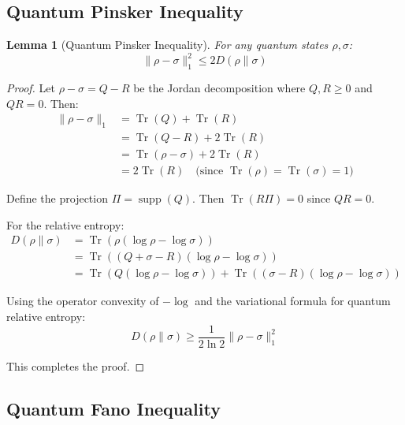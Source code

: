\documentclass{ieeeaccess}
\newtheorem{lemma}{Lemma}[section]
\begin{document}
\subsection{Quantum Pinsker Inequality}\label{app:quantum_pinsker}

\begin{lemma}[Quantum Pinsker Inequality]\label{lem:quantum_pinsker}
For any quantum states $\rho, \sigma$:
\begin{equation}
    \|\rho - \sigma\|_1^2 \leq 2 D(\rho\|\sigma)
\end{equation}
\end{lemma}

\begin{proof}
Let $\rho - \sigma = Q - R$ be the Jordan decomposition where $Q, R \geq 0$ and $QR = 0$. Then:
\begin{align}
    \|\rho - \sigma\|_1 &= \operatorname{Tr}(Q) + \operatorname{Tr}(R) \\
    &= \operatorname{Tr}(Q - R) + 2\operatorname{Tr}(R) \\
    &= \operatorname{Tr}(\rho - \sigma) + 2\operatorname{Tr}(R) \\
    &= 2\operatorname{Tr}(R) \quad \text{(since $\operatorname{Tr}(\rho) = \operatorname{Tr}(\sigma) = 1$)}
\end{align}

Define the projection $\Pi = \operatorname{supp}(Q)$. Then $\operatorname{Tr}(R\Pi) = 0$ since $QR = 0$.

For the relative entropy:
\begin{align}
    D(\rho\|\sigma) &= \operatorname{Tr}(\rho(\log\rho - \log\sigma)) \\
    &= \operatorname{Tr}((Q + \sigma - R)(\log\rho - \log\sigma)) \\
    &= \operatorname{Tr}(Q(\log\rho - \log\sigma)) + \operatorname{Tr}((\sigma - R)(\log\rho - \log\sigma))
\end{align}

Using the operator convexity of $-\log$ and the variational formula for quantum relative entropy:
\begin{equation}
    D(\rho\|\sigma) \geq \frac{1}{2\ln 2} \|\rho - \sigma\|_1^2
\end{equation}

This completes the proof.
\end{proof}

\subsection{Quantum Fano Inequality}\label{app:quantum_fano}
\end{document}
